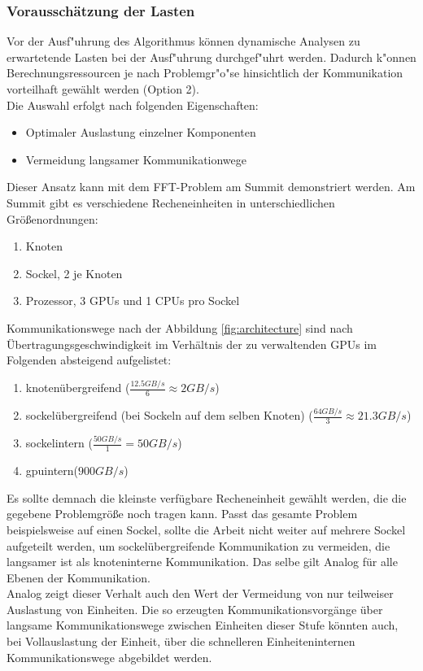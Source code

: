 \subsubsection{Vorausschätzung der Lasten}
Vor der Ausf"uhrung des Algorithmus können dynamische Analysen zu erwartetende Lasten bei der Ausf"uhrung durchgef"uhrt werden. Dadurch k"onnen Berechnungsressourcen je nach Problemgr"o"se hinsichtlich der Kommunikation vorteilhaft gewählt werden (Option 2).\\
Die Auswahl erfolgt nach folgenden Eigenschaften:
\begin{itemize}
	\item Optimaler Auslastung einzelner Komponenten
	\item Vermeidung langsamer Kommunikationwege
\end{itemize}
Dieser Ansatz kann mit dem FFT-Problem am Summit demonstriert werden.
Am Summit gibt es verschiedene Recheneinheiten in unterschiedlichen Größenordnungen:
\begin{enumerate}
	\item Knoten
	\item Sockel, 2 je Knoten
	\item Prozessor, 3 GPUs und 1 CPUs pro Sockel
\end{enumerate}
Kommunikationswege nach der Abbildung \ref{fig:architecture} sind nach Übertragungsgeschwindigkeit im Verhältnis der zu verwaltenden GPUs im Folgenden absteigend aufgelistet:
\begin{enumerate}
	\item knotenübergreifend ($\frac{12.5GB/s}{6}\approx 2GB/s$)
	\item sockelübergreifend (bei Sockeln auf dem selben Knoten) ($\frac{64GB/s}{3}\approx 21.3GB/s$)
	\item sockelintern ($\frac{50GB/s}{1}=50GB/s$)
	\item gpuintern($900GB/s$)
\end{enumerate}
Es sollte demnach die kleinste verfügbare Recheneinheit gewählt werden, die die gegebene Problemgröße noch tragen kann. Passt das gesamte Problem beispielsweise auf einen Sockel, sollte die Arbeit nicht weiter auf mehrere Sockel aufgeteilt werden, um sockelübergreifende Kommunikation zu vermeiden, die langsamer ist als knoteninterne Kommunikation. Das selbe gilt Analog für alle Ebenen der Kommunikation.\\
Analog zeigt dieser Verhalt auch den Wert der Vermeidung von nur teilweiser Auslastung von Einheiten. Die so erzeugten Kommunikationsvorgänge über langsame Kommunikationswege zwischen Einheiten dieser Stufe könnten auch, bei Vollauslastung der Einheit, über die schnelleren Einheiteninternen Kommunikationswege abgebildet werden.

